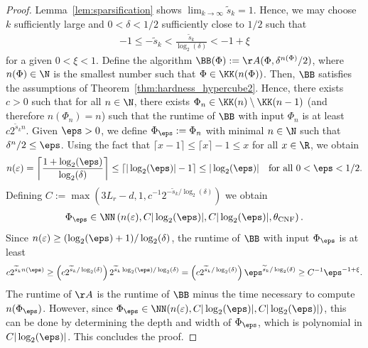 \documentclass{amsart}[11pt]
\numberwithin{equation}{section}
\numberwithin{theorem}{section}
\begin{document}
\begin{proof}
    Lemma~\ref{lem:sparsification} shows $\lim_{k\to\infty}\widetilde s_k=1$. Hence, we may choose $k$ sufficiently large and $0<\delta<1/2$ sufficiently close to $1/2$ such that
    \begin{align*}
        -1 \leq - \widetilde s_k < \frac{\widetilde s_k}{\log_2(\delta)} < -1 + \xi
    \end{align*}
    for a given $0 < \xi < 1$. 
    Define the algorithm $\BB(\Phi):=\AA(\Phi,\delta^{n(\Phi)}/2)$, where $n(\Phi)\in\N$ is the smallest number such that $\Phi \in \KK(n(\Phi))$. 
    Then, $\BB$ satisfies the assumptions of Theorem~\ref{thm:hardness_hypercube2}. 
    Hence, there exists $c > 0$ such that for all $n\in\N$, there exists $\Phi_n \in \KK(n)\setminus\KK(n-1)$ (and therefore $n(\Phi_n)=n$) such that the runtime of $\BB$ with input $\Phi_n$ is at least $c 2^{\widetilde s_k n}$.
    Given $\eps>0$, we define $\Phi_\eps:= \Phi_n$ with minimal $n\in\N$ such that $\delta^n/2 \leq \eps$. Using the fact that $\lceil x - 1\rceil\leq \lceil x\rceil -1\leq x$ for all $x\in \R$, we obtain
    \begin{align*}
        n(\varepsilon) = \left\lceil\frac{1 + \log_2(\eps)}{\log_2(\delta)}\right\rceil\leq
        \left\lceil|\log_2(\eps)|-1\right\rceil \leq |\log_2(\eps)| \quad \text{for all }0<\eps<1/2.
    \end{align*}
    Defining $C := \max\left(3L_r - d, 1, c^{-1}2^{-\widetilde s_k / \log_2(\delta)}\right)$ we obtain
     \begin{align*}
        \Phi_\eps \in \NN\left(n(\varepsilon),C |\log_2(\eps)|, C |\log_2(\eps)|, \theta_{\rm{CNF}}\right).
     \end{align*}
     Since $n(\varepsilon) \geq  (\log_2(\eps) + 1)/\log_2(\delta)$, the runtime of $\BB$ with input $\Phi_\eps$ is at least
    \begin{align*}
        c2^{\widetilde s_k n(\eps)} \geq \left(c 2^{\widetilde s_k / \log_2(\delta)} \right) 2^{\widetilde s_k\log_2(\eps)/\log_2(\delta)}= \left(c 2^{\widetilde s_k / \log_2(\delta)}\right) \eps^{\widetilde s_k/\log_2(\delta)}\geq C^{-1} \eps^{-1+\xi}.
    \end{align*}
    The runtime of $\AA$ is the runtime of $\BB$ minus the time necessary to compute $n(\Phi_\eps)$. However, since $\Phi_\eps\in\NN(n(\varepsilon),C |\log_2(\eps)|,C |\log_2(\eps)|)$, this can be done by determining the depth and width of $\Phi_\eps$, which is polynomial in $C |\log_2(\eps)|$. This concludes the proof.
\end{proof}
\end{document}
